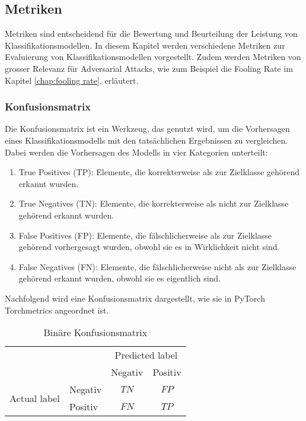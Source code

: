\subsection{Metriken} \label{chap:metriken}
Metriken sind entscheidend für die Bewertung und Beurteilung der Leistung von Klassifikationsmodellen. In diesem Kapitel werden verschiedene Metriken zur Evaluierung von Klassifikationsmodellen vorgestellt. Zudem werden Metriken von grosser Relevanz für Adversarial Attacks, wie zum Beispiel die Fooling Rate im Kapitel \ref{chap:fooling rate}, erläutert.

\subsubsection{Konfusionsmatrix} \label{chap:konfusionmatrix}
Die Konfusionsmatrix ist ein Werkzeug, das genutzt wird, um die Vorhersagen eines Klassifikationsmodells mit den tatsächlichen Ergebnissen zu vergleichen. Dabei werden die Vorhersagen des Modells in vier Kategorien unterteilt:

\begin{enumerate} 
    \item True Positives (TP): Elemente, die korrekterweise als zur Zielklasse gehörend erkannt wurden.
    \item True Negatives (TN): Elemente, die korrekterweise als nicht zur Zielklasse gehörend erkannt wurden.
    \item False Positives (FP): Elemente, die fälschlicherweise als zur Zielklasse gehörend vorhergesagt wurden, obwohl sie es in Wirklichkeit nicht sind.
    \item False Negatives (FN): Elemente, die fälschlicherweise nicht als zur Zielklasse gehörend erkannt wurden, obwohl sie es eigentlich sind.
\end{enumerate}

Nachfolgend wird eine Konfusionsmatrix dargestellt, wie sie in PyTorch Torchmetrics angeordnet ist.

\begin{table}[h]
    \centering
    \begin{tabular}{l|l|c|c|}
        \multicolumn{2}{c}{}&\multicolumn{2}{c}{Predicted label}\\
        \cline{3-4}
        \multicolumn{2}{c|}{}&Negativ&Positiv\\
        \cline{2-4}
        \multirow{2}{*}{Actual label}& Negativ & $TN$ & $FP$\\
        \cline{2-4}
        & Positiv & $FN$ & $TP$\\
        \cline{2-4}
    \end{tabular}
    \label{tab:conftable}
    \caption{Binäre Konfusionsmatrix}
\end{table}

